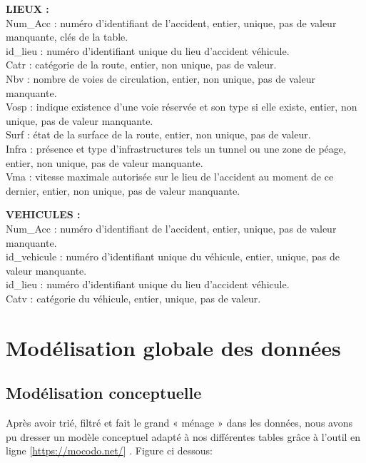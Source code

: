 \documentclass[mstat,12pt]{unswthesis}
\begin{document}
\textbf{LIEUX :}\\
Num\_Acc : numéro d'identifiant de l'accident, entier, unique, pas de
valeur manquante, clés de la table.\\
id\_lieu : numéro d'identifiant unique du lieu d'accident véhicule.\\
Catr : catégorie de la route, entier, non unique, pas de valeur.\\
Nbv : nombre de voies de circulation, entier, non unique, pas de valeur
manquante.\\
Vosp : indique existence d'une voie réservée et son type si elle existe,
entier, non unique, pas de valeur manquante.\\
Surf : état de la surface de la route, entier, non unique, pas de
valeur.\\
Infra : présence et type d'infrastructures tels un tunnel ou une zone de
péage, entier, non unique, pas de valeur manquante.\\
Vma : vitesse maximale autorisée sur le lieu de l'accident au moment de
ce dernier, entier, non unique, pas de valeur manquante.\\
\medskip

\textbf{VEHICULES :}\\
Num\_Acc : numéro d'identifiant de l'accident, entier, unique, pas de
valeur manquante.\\
id\_vehicule : numéro d'identifiant unique du véhicule, entier, unique,
pas de valeur manquante.\\
id\_lieu : numéro d'identifiant unique du lieu d'accident véhicule.\\
Catv : catégorie du véhicule, entier, unique, pas de valeur.

\hypertarget{moduxe9lisation-globale-des-donnuxe9es}{%
\chapter{Modélisation globale des
données}\label{moduxe9lisation-globale-des-donnuxe9es}}

\hypertarget{moduxe9lisation-conceptuelle}{%
\section{Modélisation conceptuelle}\label{moduxe9lisation-conceptuelle}}

\medskip

Après avoir trié, filtré et fait le grand « ménage » dans les données,
nous avons pu dresser un modèle conceptuel adapté à nos différentes
tables grâce à l'outil en ligne {[}\url{https://mocodo.net/}{]} . Figure
ci dessous:\\
\end{document}
